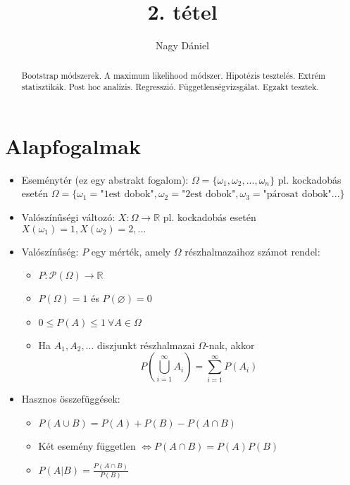 \documentclass[12pt]{article}
\theoremstyle{plain}
\begin{document}
\title{2. tétel}
\author{Nagy Dániel}
\maketitle


\newpage
\begin{abstract}
    Bootstrap módszerek. A maximum likelihood módszer. Hipotézis tesztelés. Extrém statisztikák.
    Post hoc analízis. Regresszió. Függetlenségvizsgálat. Egzakt tesztek.
\end{abstract}

\section{Alapfogalmak}
\begin{itemize}
    \item Eseménytér (ez egy abstrakt fogalom): $\Omega = \{\omega_1, \omega_2, ..., \omega_n\}$ pl. kockadobás esetén $\Omega = \{ \omega_1=\text{"1est dobok"}, \omega_2=\text{"2est dobok"}, \omega_3=\text{"párosat dobok"} ... \}$
    \item Valószínűségi változó: $X:\Omega \rightarrow \mathbb R$ pl. kockadobás esetén $X(\omega_1) = 1, X(\omega_2) = 2, ... $
    \item Valószínűség: $P$ egy mérték, amely $\Omega$ részhalmazaihoz számot rendel:
        \begin{itemize}
            \item $P: \mathcal{P}(\Omega) \rightarrow \mathbb R$
            \item $P(\Omega) = 1$ és $P(\varnothing) = 0$
            \item $ 0 \leq P(A) \leq 1 ~ \forall A \in \Omega$
            \item Ha $A_1, A_2, ...$ diszjunkt részhalmazai $\Omega$-nak, akkor 
            \begin{equation*}
                P\left(\bigcup\limits_{i=1}^{\infty}A_i\right) = \sum\limits_{i=1}^{\infty}P(A_i)
            \end{equation*}
        \end{itemize}
    \item Hasznos összefüggések:
        \begin{itemize}
            \item $P(A\cup B) = P(A)+P(B)-P(A\cap B)$
            \item Két esemény független $\Longleftrightarrow P(A\cap B) = P(A)P(B)$
            \item $P(A|B) = \frac{P(A\cap B)}{P(B)}$

\end{itemize}
\end{itemize}
\end{document}
